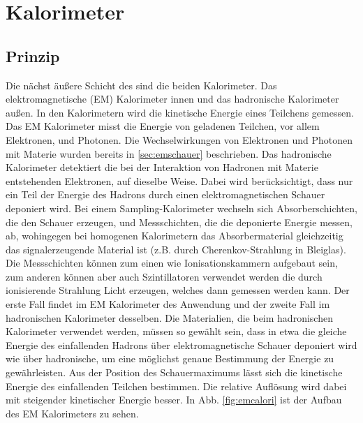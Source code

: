 \section{Kalorimeter}\label{sec:calori}
\subsection{Prinzip}
Die nächst äußere Schicht des \atlas sind die beiden Kalorimeter. Das elektromagnetische (EM) Kalorimeter innen und das hadronische Kalorimeter außen. In den Kalorimetern wird die kinetische Energie eines Teilchens gemessen. Das EM Kalorimeter misst die Energie von geladenen Teilchen, vor allem Elektronen, und Photonen. Die Wechselwirkungen von Elektronen und Photonen mit Materie wurden bereits in \ref{sec:emschauer} beschrieben. Das hadronische Kalorimeter detektiert die bei der Interaktion von Hadronen mit Materie entstehenden Elektronen, auf dieselbe Weise. Dabei wird berücksichtigt, dass nur ein Teil der Energie des Hadrons durch einen elektromagnetischen Schauer deponiert wird.
Bei einem Sampling-Kalorimeter wechseln sich Absorberschichten, die den Schauer erzeugen, und Messschichten, die die deponierte Energie messen, ab, wohingegen bei homogenen Kalorimetern das Absorbermaterial gleichzeitig das signalerzeugende Material ist (z.B. durch Cherenkov-Strahlung in Bleiglas). Die Messschichten können zum einen wie Ionisationskammern aufgebaut sein, zum anderen können aber auch Szintillatoren verwendet werden die durch ionisierende Strahlung Licht erzeugen, welches dann gemessen werden kann. Der erste Fall findet im EM Kalorimeter des \atlas Anwendung\cite{Aad:2014una} und der zweite Fall im hadronischen Kalorimeter desselben\cite{Meyer:2013joa}. Die Materialien, die beim hadronischen Kalorimeter verwendet werden, müssen so gewählt sein, dass in etwa die gleiche Energie des einfallenden Hadrons über elektromagnetische Schauer deponiert wird wie über hadronische, um eine möglichst genaue Bestimmung der Energie zu gewährleisten.
Aus der Position des Schauermaximums lässt sich die kinetische Energie des einfallenden Teilchen bestimmen. 
Die relative Auflösung wird dabei mit steigender kinetischer Energie besser. In Abb. \ref{fig:emcalori} ist der Aufbau des EM Kalorimeters zu sehen.


